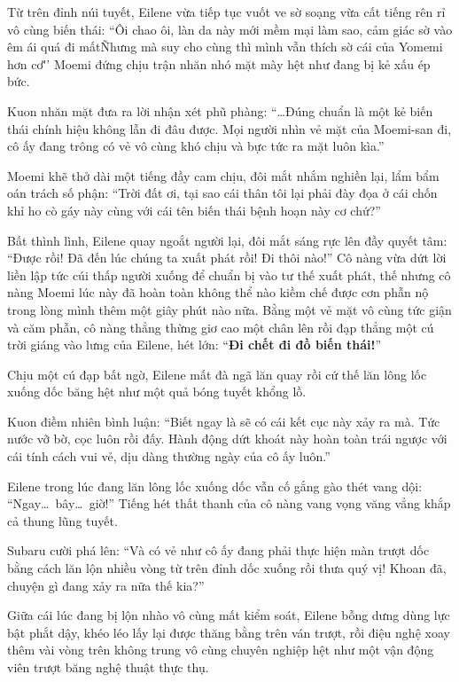 \documentclass[../main.tex]{subfiles}
\begin{document}
Từ trên đỉnh núi tuyết, Eilene vừa tiếp tục vuốt ve sờ soạng vừa cất tiếng rên rỉ vô cùng biến thái: ``Ôi chao ôi, làn da này mới mềm mại làm sao, cảm giác sờ vào êm ái quá đi mất\~ Nhưng mà suy cho cùng thì mình vẫn thích sờ cái của Yomemi hơn cơ\~'' Moemi đứng chịu trận nhăn nhó mặt mày hệt như đang bị kẻ xấu ép bức.


Kuon nhăn mặt đưa ra lời nhận xét phũ phàng: ``\dots Đúng chuẩn là một kẻ biến thái chính hiệu không lẫn đi đâu được. Mọi người nhìn vẻ mặt của Moemi-san đi, cô ấy đang trông có vẻ vô cùng khó chịu và bực tức ra mặt luôn kìa.''

Moemi khẽ thở dài một tiếng đầy cam chịu, đôi mắt nhắm nghiền lại, lẩm bẩm oán trách số phận: ``Trời đất ơi, tại sao cái thân tôi lại phải đày đọa ở cái chốn khỉ ho cò gáy này cùng với cái tên biến thái bệnh hoạn này cơ chứ?''

Bất thình lình, Eilene quay ngoắt người lại, đôi mắt sáng rực lên đầy quyết tâm: ``Được rồi! Đã đến lúc chúng ta xuất phát rồi! Đi thôi nào!'' Cô nàng vừa dứt lời liền lập tức cúi thấp người xuống để chuẩn bị vào tư thế xuất phát, thế nhưng cô nàng Moemi lúc này đã hoàn toàn không thể nào kiềm chế được cơn phẫn nộ trong lòng mình thêm một giây phút nào nữa. Bằng một vẻ mặt vô cùng tức giận và căm phẫn, cô nàng thẳng thừng giơ cao một chân lên rồi đạp thẳng một cú trời giáng vào lưng của Eilene, hét lớn: ``\textbf{Đi chết đi đồ biến thái!}''

Chịu một cú đạp bất ngờ, Eilene mất đà ngã lăn quay rồi cứ thế lăn lông lốc xuống dốc băng hệt như một quả bóng tuyết khổng lồ.

Kuon điềm nhiên bình luận: ``Biết ngay là sẽ có cái kết cục này xảy ra mà. Tức nước vỡ bờ, cọc luôn rồi đấy. Hành động dứt khoát này hoàn toàn trái ngược với cái tính cách vui vẻ, dịu dàng thường ngày của cô ấy luôn.''

Eilene trong lúc đang lăn lông lốc xuống dốc vẫn cố gắng gào thét vang dội: ``Ngay\dots\ bây\dots\ giờ!'' Tiếng hét thất thanh của cô nàng vang vọng văng vẳng khắp cả thung lũng tuyết.

Subaru cười phá lên: ``Và có vẻ như cô ấy đang phải thực hiện màn trượt dốc bằng cách lăn lộn nhiều vòng từ trên đỉnh dốc xuống rồi thưa quý vị! Khoan đã, chuyện gì đang xảy ra nữa thế kia?''

Giữa cái lúc đang bị lộn nhào vô cùng mất kiểm soát, Eilene bỗng dưng dùng lực bật phắt dậy, khéo léo lấy lại được thăng bằng trên ván trượt, rồi điệu nghệ xoay thêm vài vòng trên không trung vô cùng chuyên nghiệp hệt như một vận động viên trượt băng nghệ thuật thực thụ.
\end{document}
